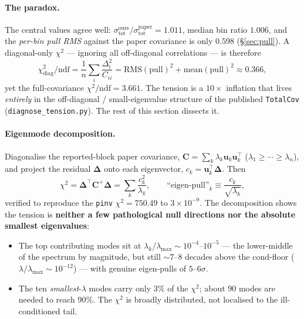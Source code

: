 \documentclass[12pt]{article}
\newcommand{\ours}{\text{ours}}
\newcommand{\paper}{\text{paper}}
\newcommand{\tot}{\text{tot}}
\newcommand{\T}{^{\!\top}}
\newcommand{\diag}{\mathrm{diag}}
\begin{document}
\paragraph{The paradox.}
The central values agree well: $\sigma_{\tot}^{\ours}/\sigma_{\tot}^{\paper}
= 1.011$, median bin ratio $1.006$, and the \emph{per-bin pull RMS}
against the paper covariance is only $0.598$ (\S\ref{sec:pull}).
A diagonal-only $\chi^{2}$ --- ignoring all off-diagonal correlations ---
is therefore
\begin{equation}
\chi^{2}_{\diag}/\mathrm{ndf}
= \frac{1}{n}\sum_{i}\frac{\Delta_{i}^{2}}{C_{ii}}
= \mathrm{RMS}(\mathrm{pull})^{2} + \mathrm{mean}(\mathrm{pull})^{2}
\approx 0.366,
\end{equation}
yet the full-covariance $\chi^{2}/\mathrm{ndf}=3.661$. The tension is a
$10\times$ inflation that lives \emph{entirely} in the off-diagonal /
small-eigenvalue structure of the published \texttt{TotalCov}
(\texttt{diagnose\_tension.py}). The rest of this section dissects it.

\paragraph{Eigenmode decomposition.}
Diagonalise the reported-block paper covariance,
$\mathbf{C}=\sum_{k}\lambda_{k}\mathbf{u}_{k}\mathbf{u}_{k}\T$
($\lambda_{1}\!\ge\!\cdots\!\ge\!\lambda_{n}$), and project the residual
$\boldsymbol{\Delta}$ onto each eigenvector, $c_{k}=\mathbf{u}_{k}\T\boldsymbol{\Delta}$.
Then
\begin{equation}
\chi^{2}=\boldsymbol{\Delta}\T\mathbf{C}^{+}\boldsymbol{\Delta}
=\sum_{k}\frac{c_{k}^{2}}{\lambda_{k}},
\qquad
\text{``eigen-pull''}_{k}\equiv\frac{c_{k}}{\sqrt{\lambda_{k}}},
\end{equation}
verified to reproduce the \texttt{pinv} $\chi^{2}=750.49$ to $3\times10^{-9}$.
The decomposition shows the tension is \textbf{neither a few pathological
null directions nor the absolute smallest eigenvalues}:
\begin{itemize}[nosep]
  \item The top contributing modes sit at $\lambda_{k}/\lambda_{\max}\sim
        10^{-4}$--$10^{-5}$ --- the lower-middle of the spectrum by
        magnitude, but still $\sim7$--$8$ decades above the cond-floor
        ($\lambda/\lambda_{\max}\sim10^{-12}$) --- with genuine eigen-pulls
        of $5$--$6\sigma$.
  \item The ten \emph{smallest}-$\lambda$ modes carry only $3\%$ of the
        $\chi^{2}$; about $90$ modes are needed to reach $90\%$. The
        $\chi^{2}$ is broadly distributed, not localised to the
        ill-conditioned tail.
\end{itemize}
\end{document}
